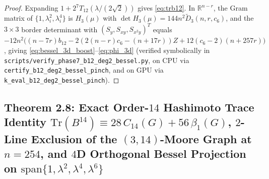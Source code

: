\documentclass[10pt,a4paper]{article}
\theoremstyle{definition}
\theoremstyle{remark}
\begin{document}
\begin{proof}
Expanding $1 + 2^7 T_{12}(\lambda/(2\sqrt{2}))$ gives \eqref{eq:trb12}. In $\mathbb{R}^{n-r}$, the Gram matrix of $\{1, \lambda_i^2, \lambda_i^4\}$ is $H_3(\mu)$ with $\det H_3(\mu) = 144 n^2 \tilde{D}_3(n,r,c_6)$, and the $3 \times 3$ border determinant with $(S_y, S_{xy}, S_{x^2 y})^T$ equals $-12 n^2 \bigl((n-7r)b_{12} - 2(2(n-r)c_6 - (n+17r))Z + 12(c_6-2)(n+257r)\bigr)$, giving \eqref{eq:bessel_3d_boost}--\eqref{eq:phi_3d} (verified symbolically in \texttt{scripts/verify\_phase7\_b12\_deg2\_bessel.py}, on CPU via \texttt{certify\_b12\_deg2\_bessel\_pinch}, and on GPU via \texttt{k\_eval\_b12\_deg2\_bessel\_pinch}).
\end{proof}

\subsection{Theorem 2.8: Exact Order-$14$ Hashimoto Trace Identity $\mathrm{Tr}(B^{14}) \equiv 28\,C_{14}(G) + 56\,\beta_1(G)$, $2$-Line Exclusion of the $(3,14)$-Moore Graph at $n = 254$, and $4$D Orthogonal Bessel Projection on $\mathrm{span}\{1, \lambda^2, \lambda^4, \lambda^6\}$}
\end{document}
